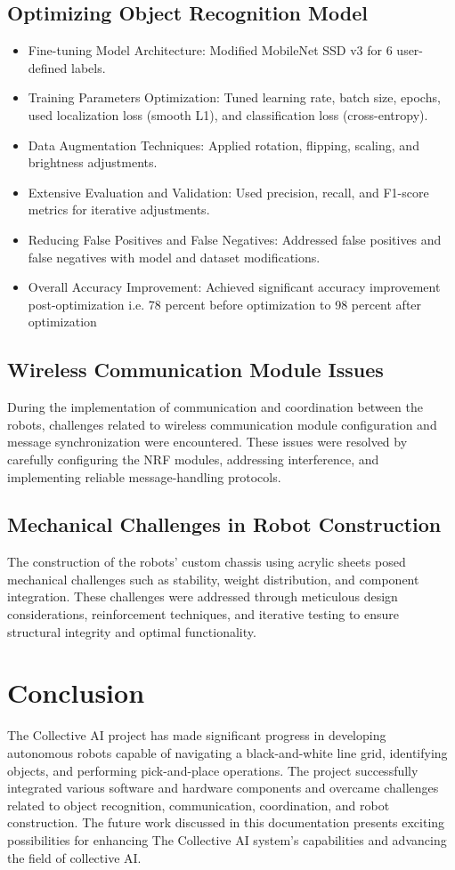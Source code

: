 \documentclass[a4paper,12pt,oneside]{book}
\begin{document}
\subsection*{Optimizing Object Recognition Model}
\begin{itemize}
    \item Fine-tuning Model Architecture: Modified MobileNet SSD v3 for 6 user-defined labels.
    \item Training Parameters Optimization: Tuned learning rate, batch size, epochs, used localization loss (smooth L1), and classification loss (cross-entropy).
    \item Data Augmentation Techniques: Applied rotation, flipping, scaling, and brightness adjustments.
    \item Extensive Evaluation and Validation: Used precision, recall, and F1-score metrics for iterative adjustments.
    \item Reducing False Positives and False Negatives: Addressed false positives and false negatives with model and dataset modifications.
    \item Overall Accuracy Improvement: Achieved significant accuracy improvement post-optimization i.e. 78 percent before optimization to 98 percent after optimization
\end{itemize}

\subsection{Wireless Communication Module Issues}
During the implementation of communication and coordination between the robots, challenges related to wireless communication module configuration and message synchronization were encountered. These issues were resolved by carefully configuring the NRF modules, addressing interference, and implementing reliable message-handling protocols.

\subsection{Mechanical Challenges in Robot Construction}
The construction of the robots' custom chassis using acrylic sheets posed mechanical challenges such as stability, weight distribution, and component integration. These challenges were addressed through meticulous design considerations, reinforcement techniques, and iterative testing to ensure structural integrity and optimal functionality.
\newpage
\section{Conclusion}
The Collective AI project has made significant progress in developing autonomous robots capable of navigating a black-and-white line grid, identifying objects, and performing pick-and-place operations. The project successfully integrated various software and hardware components and overcame challenges related to object recognition, communication, coordination, and robot construction. The future work discussed in this documentation presents exciting possibilities for enhancing The Collective AI system's capabilities and advancing the field of collective AI.
\newpage
\end{document}
